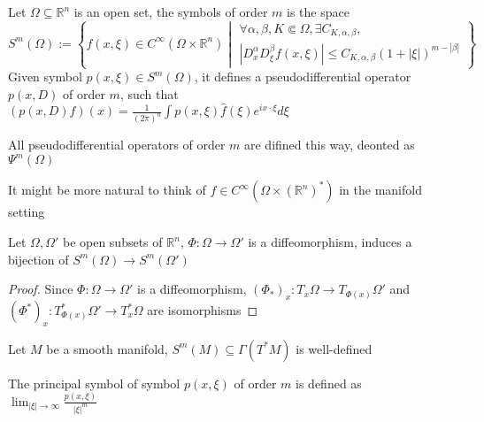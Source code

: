 \documentclass[../main.tex]{subfiles}
\begin{document}
\begin{definition}
Let $\Omega\subseteq\mathbb R^n$ is an open set, the symbols of order $m$ is the space
\[
S^m(\Omega):=\left\{
f(x,\xi)\in C^\infty\left(\Omega\times\mathbb R^n\right) \middle| 
\begin{array}{l}
\forall\alpha,\beta,K\Subset\Omega,\exists C_{K,\alpha,\beta}, \\
\left|D_{x}^{\alpha}D_{\xi}^{\beta}f(x,\xi)\right|\leq C_{K,\alpha,\beta}\left(1+|\xi|\right)^{m-|\beta|}
\end{array}
\right\}
\]
Given symbol $p(x,\xi)\in S^m(\Omega)$, it defines a pseudodifferential operator $p(x,D)$ of order $m$, such that $\left(p(x,D)f\right)(x)=\displaystyle\frac{1}{(2\pi)^n}\int p(x,\xi)\widehat{f}(\xi)e^{ix\cdot\xi}d\xi$ \par
All pseudodifferential operators of order $m$ are difined this way, deonted as $\Psi^m(\Omega)$
\end{definition}
\begin{remark}
It might be more natural to think of $f\in C^\infty\left(\Omega\times(\mathbb R^n)^*\right)$ in the manifold setting
\end{remark}

\begin{theorem}
Let $\Omega,\Omega'$ be open subsets of $\mathbb R^n$, $\Phi: \Omega\rightarrow\Omega'$ is a diffeomorphism, induces a bijection of $S^m(\Omega)\rightarrow S^m(\Omega')$
\end{theorem}
\begin{proof}
Since $\Phi: \Omega\rightarrow\Omega'$ is a diffeomorphism, $(\Phi_*)_x: T_x\Omega\rightarrow T_{\Phi(x)}\Omega'$ and $(\Phi^*)_x: T^*_{\Phi(x)}\Omega'\rightarrow T^*_x\Omega$ are isomorphisms
\end{proof}
\begin{corollary}
Let $M$ be a smooth manifold, $S^m(M)\subseteq \Gamma(T^*M)$ is well-defined
\end{corollary}
\begin{definition}
The principal symbol of symbol $p(x,\xi)$ of order $m$ is defined as $\displaystyle\lim_{|\xi|\to\infty}\frac{p(x,\xi)}{|\xi|^m}$
\end{definition}
\end{document}
